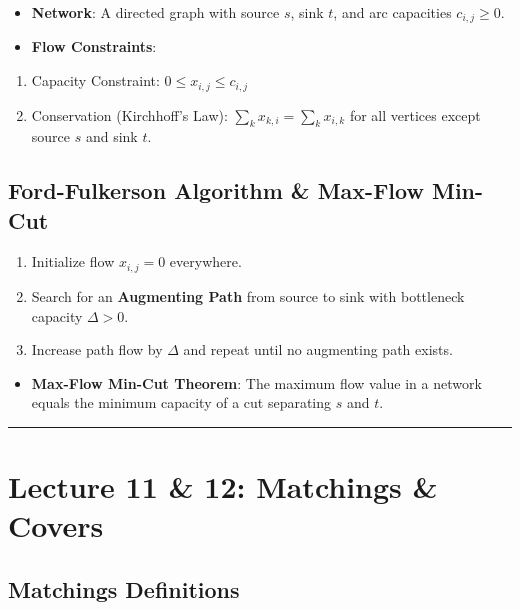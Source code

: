 \documentclass[
]{book}
\providecommand{\tightlist}{%
  \setlength{\itemsep}{0pt}\setlength{\parskip}{0pt}}
\theoremstyle{definition}
\theoremstyle{definition}
\theoremstyle{definition}
\theoremstyle{definition}
\theoremstyle{remark}
\begin{document}
\begin{itemize}
\item
  \textbf{Network}: A directed graph with source \(s\), sink \(t\), and arc capacities \(c_{i,j} \ge 0\).
\item
  \textbf{Flow Constraints}:
\end{itemize}

\begin{enumerate}
\def\labelenumi{\arabic{enumi}.}
\item
  Capacity Constraint: \(0 \le x_{i,j} \le c_{i,j}\)
\item
  Conservation (Kirchhoff's Law): \(\sum_{k} x_{k,i} = \sum_{k} x_{i,k}\) for all vertices except source \(s\) and sink \(t\).
\end{enumerate}

\subsection{Ford-Fulkerson Algorithm \& Max-Flow Min-Cut}\label{ford-fulkerson-algorithm-max-flow-min-cut}

\begin{enumerate}
\def\labelenumi{\arabic{enumi}.}
\item
  Initialize flow \(x_{i,j} = 0\) everywhere.
\item
  Search for an \textbf{Augmenting Path} from source to sink with bottleneck capacity \(\Delta > 0\).
\item
  Increase path flow by \(\Delta\) and repeat until no augmenting path exists.
\end{enumerate}

\begin{itemize}
\tightlist
\item
  \textbf{Max-Flow Min-Cut Theorem}: The maximum flow value in a network equals the minimum capacity of a cut separating \(s\) and \(t\).
\end{itemize}

\begin{center}\rule{0.5\linewidth}{0.5pt}\end{center}

\section{Lecture 11 \& 12: Matchings \& Covers}\label{lecture-11-12-matchings-covers}

\subsection{Matchings Definitions}\label{matchings-definitions}
\end{document}
